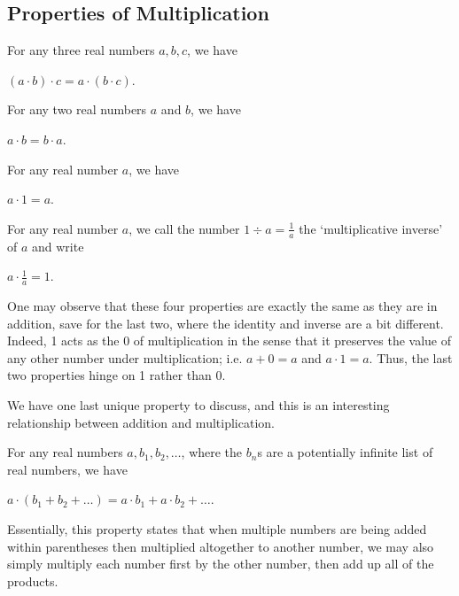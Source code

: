 \documentclass[openany]{book}
\begin{document}
\subsection{Properties of Multiplication}
\begin{property}
	For any three real numbers $a,b,c$, we have
	\begin{center}
		$(a\cdot b)\cdot c = a\cdot(b\cdot c)$.
	\end{center}
\end{property}
\begin{property}
	For any two real numbers $a$ and $b$, we have
	\begin{center}
		$a\cdot b = b\cdot a$.
	\end{center}
\end{property}
\begin{property}
	For any real number $a$, we have
	\begin{center}
		$a\cdot 1=a$.
	\end{center}
\end{property}
\begin{property}
	For any real number $a$, we call the number $1\div a = \frac{1}{a}$ the `multiplicative inverse' of $a$ and write
	\begin{center}
		$a\cdot\frac{1}{a}=1$.
	\end{center}
\end{property}
One may observe that these four properties are exactly the same as they are in addition, save for the last two, where the identity and inverse are a bit different. Indeed, 1 acts as the 0 of multiplication in the sense that it preserves the value of any other number under multiplication; i.e. $a+0=a$ and $a\cdot1=a$. Thus, the last two properties hinge on 1 rather than 0.\par
We have one last unique property to discuss, and this is an interesting relationship between addition and multiplication.
\begin{property}
	For any real numbers $a,b_{1},b_{2},\ldots$, where the $b_{n}$s are a potentially infinite list of real numbers, we have
	\begin{center}
		$a\cdot(b_{1}+b_{2}+\ldots) = a\cdot b_{1} + a\cdot b_{2} + \ldots$.
	\end{center}
	Essentially, this property states that when multiple numbers are being added within parentheses then multiplied altogether to another number, we may also simply multiply each number first by the other number, then add up all of the products.
\end{property}
\end{document}
